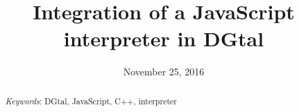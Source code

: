 \documentclass[11pt, english, screen, research-development]{report-rd-info}
\begin{document}
\title{Integration of a JavaScript interpreter in DGtal}

\date{November 25, 2016}



\begin{abstract}
\textit{Keywords}: DGtal, JavaScript, C++, interpreter
    \begin{comment}
    
   As the name suggests, the abstract is a very short but informative piece of information about everything you did in this work, i.e., successively the description of the problem at hand, the objectives, the main point of the state-of-the-art, the choices made, the conceptual developments, the conducted experiments, results and interpretations, the new issues.

   It is the last thing to write!
   (Do not provide any details, give popular scientific information.  The introduction and conclusion of the report are there to develop the overall ideas.)
   \end{comment}
\end{abstract}
\end{document}
